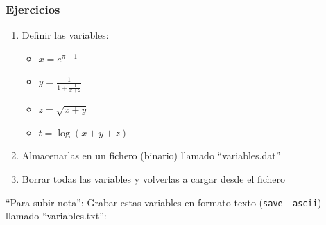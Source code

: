 \begin{frame}[containsverbatim]
\frametitle{Ejercicios}
\begin{enumerate}
\item
  Definir las variables:
  \begin{itemize}
  \item $\displaystyle x=e^{\pi-1}$
  \item $\displaystyle y=\frac{1}{1+\frac{1}{x+2}}$
  \item $\displaystyle z=\sqrt{x+y}$
  \item $\displaystyle t=\log(x+y+z)$
  \end{itemize}
\item Almacenarlas en un fichero (binario) llamado ``variables.dat''
\item Borrar todas las variables y volverlas a cargar desde el fichero
\end{enumerate}
\bigskip
``Para subir nota'': Grabar estas variables en formato texto (\texttt{save -ascii}) llamado ``variables.txt'':
\end{frame}


